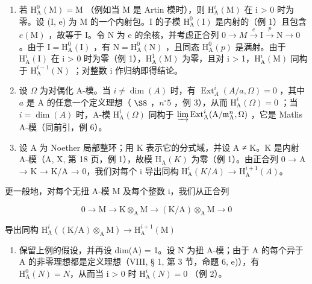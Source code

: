 \begin{enumerate}
\def\labelenumi{\arabic{enumi})}
\setcounter{enumi}{1}
\item
  若 \(\mathrm{H}_{\mathrm{A}}^{0}(\mathrm{M})=\mathrm{M}\) （例如当 M 是 Artin 模时），则 \(\mathrm{H}_{\mathrm{A}}^{i}(\mathrm{M})\) 在 i > 0 时为零。设 (I, e) 为 M 的一个内射包。I 的子模 \(\mathrm{H}_{\mathrm{A}}^{0}(\mathrm{I})\) 是内射的（例 1）且包含 \(e(\mathrm{M})\) ，故等于 I。令 N 为 e 的余核，并考虑正合列 \(0\rightarrow M\xrightarrow{e}\mathrm{I}\xrightarrow{p}\mathrm{N}\rightarrow0\) 。由于 \(\mathrm{I}=\mathrm{H}_{\mathrm{A}}^{0}(\mathrm{I})\) ，有 \(\mathrm{N}=\mathrm{H}_{\mathrm{A}}^{0}(\mathrm{N})\) ，且同态 \(\mathrm{H}_{\mathrm{A}}^{0}(p)\) 是满射。由于 \(\mathrm{H}_{\mathrm{A}}^{i}(\mathrm{I})\) 在 i > 0 时为零（例 1），\(\mathrm{H}_{\mathrm{A}}^{1}(\mathrm{M})\) 为零，且对 i > 1，\(\mathrm{H}_{\mathrm{A}}^{i}(\mathrm{M})\) 同构于 \(\mathrm{H}_{\mathrm{A}}^{i-1}(\mathrm{N})\) ；对整数 i 作归纳即得结论。
\item
  设 \(\Omega\) 为对偶化 A-模。当 \(i \neq \dim(A)\) 时，有 \(\operatorname{Ext}_{A}^{i}(A/a, \Omega) = 0\) ，其中 \(a\) 是 A 的任意一个定义理想（ \(\S 8\) ，\(n^{\circ} 5\) ，例 3），从而 \(\mathrm{H}_{\mathrm{A}}^{i}(\Omega) = 0\) ；当 \(i = \dim(A)\) 时，A-模 \(\mathrm{H}_{\mathrm{A}}^{i}(\Omega)\) 同构于 \(\varinjlim \operatorname{Ext}_{\mathrm{A}}^{i}(\mathrm{A}/\mathfrak{m}_{\mathrm{A}}^{n}, \Omega)\) ，它是 Matlis A-模（同前引，例 6）。
\item
  设 A 为 Noether 局部整环；用 K 表示它的分式域，并设 A ≠ K。K 是内射 A-模（A, X, 第 18 页，例 1），故模 \(\mathrm{H}_{\mathrm{A}}(K)\) 为零（例 1）。由正合列 0 → A → K → K/A → 0，我们对每个 i 导出同构 \(\mathrm{H}_{\mathrm{A}}^{i}(K/A)\) → \(\mathrm{H}_{\mathrm{A}}^{i+1}(A)\)。
\end{enumerate}

更一般地，对每个无扭 A-模 M 及每个整数 i，我们从正合列

\[
0 \rightarrow \mathrm{M} \rightarrow \mathrm{K} \otimes_ {\mathrm{A}} \mathrm{M} \rightarrow (\mathrm{K/A}) \otimes_ {\mathrm{A}} \mathrm{M} \rightarrow 0
\]

导出同构 \(\mathrm{H}_{\mathrm{A}}^{i}((\mathrm{K}/\mathrm{A})\otimes_{\mathrm{A}}\mathrm{M})\to \mathrm{H}_{\mathrm{A}}^{i + 1}(\mathrm{M})\)

\begin{enumerate}
\def\labelenumi{\arabic{enumi})}
\setcounter{enumi}{4}
\tightlist
\item
  保留上例的假设，并再设 dim(A) = 1。设 N 为扭 A-模；由于 A 的每个异于 A 的非零理想都是定义理想（VIII, § 1, 第 3 节，命题 6, e)），有 \(\mathrm{H}_{\mathrm{A}}^{0}(N) = N\)，从而当 i > 0 时 \(\mathrm{H}_{\mathrm{A}}^{i}(N) = 0\) （例 2）。
\end{enumerate}

